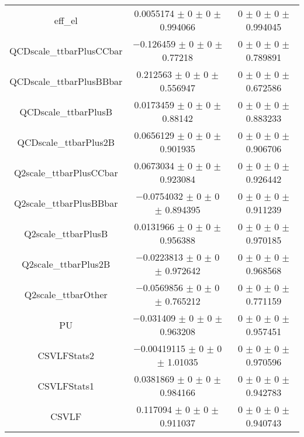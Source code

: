 \begin{table}
\begin{tabular}{ccc}
eff\_el 	& \num{0.0055174} $\pm$ \num{0} $\pm$ \num{0} $\pm$ \num{0.994066} 	& \num{0} $\pm$ \num{0} $\pm$ \num{0} $\pm$ \num{0.994045}\\
QCDscale\_ttbarPlusCCbar 	& \num{-0.126459} $\pm$ \num{0} $\pm$ \num{0} $\pm$ \num{0.77218} 	& \num{0} $\pm$ \num{0} $\pm$ \num{0} $\pm$ \num{0.789891}\\
QCDscale\_ttbarPlusBBbar 	& \num{0.212563} $\pm$ \num{0} $\pm$ \num{0} $\pm$ \num{0.556947} 	& \num{0} $\pm$ \num{0} $\pm$ \num{0} $\pm$ \num{0.672586}\\
QCDscale\_ttbarPlusB 	& \num{0.0173459} $\pm$ \num{0} $\pm$ \num{0} $\pm$ \num{0.88142} 	& \num{0} $\pm$ \num{0} $\pm$ \num{0} $\pm$ \num{0.883233}\\
QCDscale\_ttbarPlus2B 	& \num{0.0656129} $\pm$ \num{0} $\pm$ \num{0} $\pm$ \num{0.901935} 	& \num{0} $\pm$ \num{0} $\pm$ \num{0} $\pm$ \num{0.906706}\\
Q2scale\_ttbarPlusCCbar 	& \num{0.0673034} $\pm$ \num{0} $\pm$ \num{0} $\pm$ \num{0.923084} 	& \num{0} $\pm$ \num{0} $\pm$ \num{0} $\pm$ \num{0.926442}\\
Q2scale\_ttbarPlusBBbar 	& \num{-0.0754032} $\pm$ \num{0} $\pm$ \num{0} $\pm$ \num{0.894395} 	& \num{0} $\pm$ \num{0} $\pm$ \num{0} $\pm$ \num{0.911239}\\
Q2scale\_ttbarPlusB 	& \num{0.0131966} $\pm$ \num{0} $\pm$ \num{0} $\pm$ \num{0.956388} 	& \num{0} $\pm$ \num{0} $\pm$ \num{0} $\pm$ \num{0.970185}\\
Q2scale\_ttbarPlus2B 	& \num{-0.0223813} $\pm$ \num{0} $\pm$ \num{0} $\pm$ \num{0.972642} 	& \num{0} $\pm$ \num{0} $\pm$ \num{0} $\pm$ \num{0.968568}\\
Q2scale\_ttbarOther 	& \num{-0.0569856} $\pm$ \num{0} $\pm$ \num{0} $\pm$ \num{0.765212} 	& \num{0} $\pm$ \num{0} $\pm$ \num{0} $\pm$ \num{0.771159}\\
PU 	& \num{-0.031409} $\pm$ \num{0} $\pm$ \num{0} $\pm$ \num{0.963208} 	& \num{0} $\pm$ \num{0} $\pm$ \num{0} $\pm$ \num{0.957451}\\
CSVLFStats2 	& \num{-0.00419115} $\pm$ \num{0} $\pm$ \num{0} $\pm$ \num{1.01035} 	& \num{0} $\pm$ \num{0} $\pm$ \num{0} $\pm$ \num{0.970596}\\
CSVLFStats1 	& \num{0.0381869} $\pm$ \num{0} $\pm$ \num{0} $\pm$ \num{0.984166} 	& \num{0} $\pm$ \num{0} $\pm$ \num{0} $\pm$ \num{0.942783}\\
CSVLF 	& \num{0.117094} $\pm$ \num{0} $\pm$ \num{0} $\pm$ \num{0.911037} 	& \num{0} $\pm$ \num{0} $\pm$ \num{0} $\pm$ \num{0.940743}\\

\end{tabular}
\end{table}
